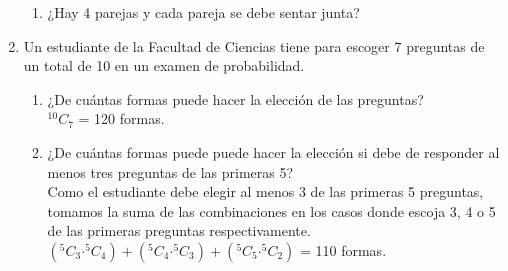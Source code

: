 \documentclass[12pt,a4paper]{report}
\newcommand*{\Comb}[2]{{}^{#1}C_{#2}}
\begin{document}
\begin{enumerate}
{\begin{enumerate}[label=\alph*) ]
{   }

   \item {
   ¿Hay 4 parejas y cada pareja se debe sentar junta?\\

   }

	\end{enumerate}

    }

   \item {
    Un estudiante de la Facultad de Ciencias tiene para escoger 7 preguntas
    de un total de 10 en un examen de probabilidad.\\

	\begin{enumerate}[label=\alph*) ]
   \item {
   ¿De cuántas formas puede hacer la elección de las preguntas?\\
	
	$\Comb{10}{7}$ = 120 formas.\\

   }

   \item {
   ¿De cuántas formas puede puede hacer la elección si debe de responder
   al menos tres preguntas de las primeras 5?\\

	Como el estudiante debe elegir al menos 3 de las primeras 5 preguntas, tomamos la suma de las combinaciones en los casos donde escoja 3, 4 o 5 de las primeras preguntas respectivamente.  \\

         $(\Comb{5}{3} \boldsymbol{\cdot} \Comb{5}{4}) +(\Comb{5}{4} \boldsymbol{\cdot} \Comb{5}{3}) +(\Comb{5}{5} \boldsymbol{\cdot} \Comb{5}{2})$ = 110 formas.\\

   }
	\end{enumerate}
    }
\end{enumerate}
\end{document}
